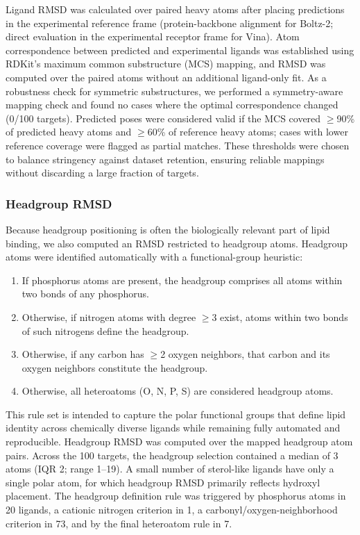 \documentclass[journal=jcisd8,manuscript=article]{achemso}
\begin{document}
Ligand RMSD was calculated over paired heavy atoms after placing predictions in the experimental reference frame (protein-backbone alignment for Boltz-2; direct evaluation in the experimental receptor frame for Vina).
Atom correspondence between predicted and experimental ligands was established using RDKit's maximum common substructure (MCS) mapping, and RMSD was computed over the paired atoms without an additional ligand-only fit.
As a robustness check for symmetric substructures, we performed a symmetry-aware mapping check and found no cases where the optimal correspondence changed (0/100 targets).
Predicted poses were considered valid if the MCS covered $\geq$90\% of predicted heavy atoms and $\geq$60\% of reference heavy atoms; cases with lower reference coverage were flagged as partial matches.
These thresholds were chosen to balance stringency against dataset retention, ensuring reliable mappings without discarding a large fraction of targets.

\subsubsection{Headgroup RMSD}

Because headgroup positioning is often the biologically relevant part of lipid binding, we also computed an RMSD restricted to headgroup atoms.
Headgroup atoms were identified automatically with a functional-group heuristic:
\begin{enumerate}
    \item If phosphorus atoms are present, the headgroup comprises all atoms within two bonds of any phosphorus.
    \item Otherwise, if nitrogen atoms with degree $\geq$3 exist, atoms within two bonds of such nitrogens define the headgroup.
    \item Otherwise, if any carbon has $\geq$2 oxygen neighbors, that carbon and its oxygen neighbors constitute the headgroup.
    \item Otherwise, all heteroatoms (O, N, P, S) are considered headgroup atoms.
\end{enumerate}
This rule set is intended to capture the polar functional groups that define lipid identity across chemically diverse ligands while remaining fully automated and reproducible.
Headgroup RMSD was computed over the mapped headgroup atom pairs.
Across the 100 targets, the headgroup selection contained a median of 3 atoms (IQR 2; range 1--19). A small number of sterol-like ligands have only a single polar atom, for which headgroup RMSD primarily reflects hydroxyl placement.
The headgroup definition rule was triggered by phosphorus atoms in 20 ligands, a cationic nitrogen criterion in 1, a carbonyl/oxygen-neighborhood criterion in 73, and by the final heteroatom rule in 7.
\end{document}

